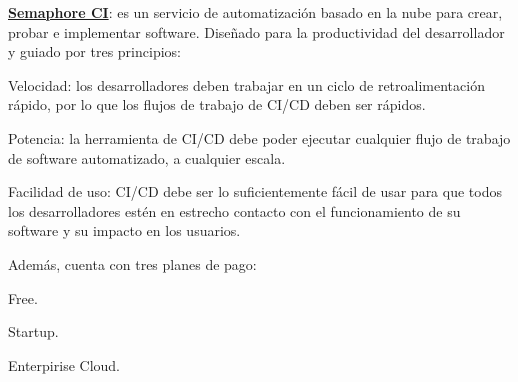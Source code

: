 \begin{compactitem}
    \item \textbf{\underline{Semaphore CI}}: es un servicio de automatización basado en la nube para crear, probar e implementar software. Diseñado para la productividad del desarrollador y guiado por tres principios:
    \begin{compactitem}
        \item Velocidad: los desarrolladores deben trabajar en un ciclo de retroalimentación rápido, por lo que los flujos de trabajo de CI/CD deben ser rápidos.
        \item Potencia: la herramienta de CI/CD debe poder ejecutar cualquier flujo de trabajo de software automatizado, a cualquier escala.
        \item Facilidad de uso: CI/CD debe ser lo suficientemente fácil de usar para que todos los desarrolladores estén en estrecho contacto con el funcionamiento de su software y su impacto en los usuarios.
    \end{compactitem}
    Además, cuenta con tres planes de pago:
    \begin{compactitem}
        \item Free.
        \item Startup.
        \item Enterpirise Cloud.
    \end{compactitem}


\end{compactitem}

